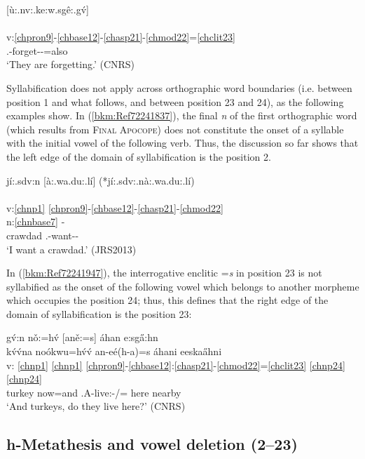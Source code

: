 \documentclass[output=paper]{langscibook}
\begin{document}
\ea\label{ex:cher:key:43} {[ù:.nv:.ke:w.sgê:.gv́]} \\
\\
v:\ref{chpron9}-\ref{chbase12}-\ref{chasp21}-\ref{chmod22}=\ref{chclit23}\\
\Third\Pl.\Barg{}-forget-\Prs{}-\Ind{}=also\\
\glt `They are forgetting.' (CNRS)
\z 

Syllabification does not apply across orthographic word boundaries (i.e. between position 1 and what follows, and between position 23 and 24), as the following examples show. In (\ref{bkm:Ref72241837}), the final \textit{n} of the first orthographic word (which results from \textsc{Final} \textsc{Apocope}) does not constitute the onset of a syllable with the initial vowel of the following verb. Thus, the discussion so far shows that the left edge of the domain of syllabification is the position 2. 

\ea\label{bkm:Ref72241837}jí:.sdv:n [à:.wa.du:.lí] (*jí:.sdv:.nà:.wa.du:.lí) \\
\\
v:\ref{chnp1} \ref{chpron9}-\ref{chbase12}-\ref{chasp21}-\ref{chmod22}\\
n:\ref{chnbase7} -\\  
crawdad \First\Sg.\Barg{}-want-\Prs{}-\Ind{}\\ 
\glt `I want a crawdad.' (JRS2013)
\z 

In (\ref{bkm:Ref72241947}), the interrogative enclitic =\textit{s} in position 23 is not syllabified as the onset of the following vowel which belongs to another morpheme which occupies the position 24; thus, this defines that the right edge of the domain of syllabification is the position 23:

\ea\label{bkm:Ref72241947} gv́:n nǒ:=hv́ [aně:=s] áhan e:sga̋:hn \\
    \glll {} kv́v́na noókwu=hv́v́ an-eé(h-a)=s áhani	eeskaa̋hni  \\
    v: \ref{chnp1} \ref{chnp1} \ref{chpron9}-\ref{chbase12}:\ref{chasp21}-\ref{chmod22}=\ref{chclit23} \ref{chnp24} \ref{chnp24} \\  
    {} turkey now=and \Third{}\Pl{}.A-live:\Stat{}-\Nom{}/\Sh{}=\Q{} here nearby \\
    \glt `And turkeys, do they live here?' (CNRS)
\z 


\subsection{h-Metathesis and vowel deletion (2--23)} \label{sec:3.6}
\end{document}
